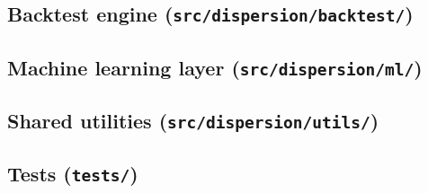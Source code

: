 \subsection{Backtest engine (\texttt{src/dispersion/backtest/})}



\subsection{Machine learning layer (\texttt{src/dispersion/ml/})}





\subsection{Shared utilities (\texttt{src/dispersion/utils/})}


\subsection{Tests (\texttt{tests/})}





